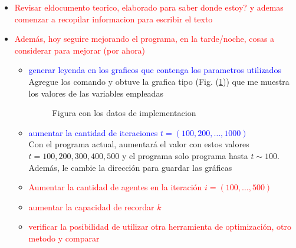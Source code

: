 \documentclass[a4paper,14pt]{article}
\begin{document}
\begin{itemize}
\begin{center}
\end{center}
\item \textcolor{red}{Revisar eldocumento teorico, elaborado para saber donde estoy? y ademas comenzar a recopilar informacion para escribir el texto}\\
\item \textcolor{red}{Además, hoy seguire mejorando el programa, en la tarde/noche, cosas a considerar para mejorar (por ahora)}
\begin{itemize}
\item \textcolor{blue}{generar leyenda en los graficos que contenga los parametros utilizados}\\
Agregue los comando y obtuve la grafica tipo (Fig. (\ref{F3[01/04/2020]})) que me muestra los valores de las variables empleadas
\begin{figure}[h]
\centering
\label{F3[01/04/2020]}
\caption{Figura con los datos de implementacion}
\end{figure}
\end{itemize}
\begin{itemize}
\item \textcolor{blue}{ aumentar la cantidad de iteraciones $t=(100, 200,\dots, 1000)$}\\
Con el programa actual, aumentará el valor con estos valores $t=100, 200, 300, 400, 500$ y el programa solo programa hasta $t\sim 100$. Además, le cambie la dirección para guardar las gráficas

\item \textcolor{red}{ Aumentar la cantidad de agentes en la iteración $i=(100,\dots, 500)$}
\item \textcolor{red}{ aumentar la capacidad de recordar $k$}
\item \textcolor{red}{ verificar la posibilidad de utilizar otra herramienta de optimización, otro metodo y comparar}
\end{itemize}
\end{itemize}
\newpage
[02/04/2020]\\
\end{document}
